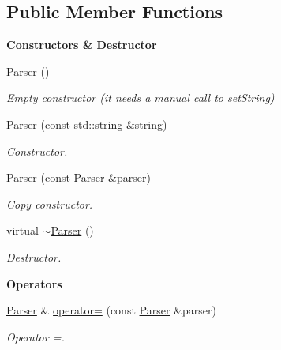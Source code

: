 \subsection*{Public Member Functions}
\begin{Indent}\textbf{ Constructors \& Destructor}\par
\begin{DoxyCompactItemize}
\item 
\mbox{\label{classLifeV_1_1Parser_a439ecd746d503e75b6e07f2933a665dc}} 
\hyperlink{classLifeV_1_1Parser_a439ecd746d503e75b6e07f2933a665dc}{Parser} ()
\begin{DoxyCompactList}\small\item\em Empty constructor (it needs a manual call to set\+String) \end{DoxyCompactList}\item 
\hyperlink{classLifeV_1_1Parser_a6acf25b7222f0c65d1414611236d1820}{Parser} (const std\+::string \&string)
\begin{DoxyCompactList}\small\item\em Constructor. \end{DoxyCompactList}\item 
\hyperlink{classLifeV_1_1Parser_a0f7c4d10928fd2139e76baf44996b610}{Parser} (const \hyperlink{classLifeV_1_1Parser}{Parser} \&parser)
\begin{DoxyCompactList}\small\item\em Copy constructor. \end{DoxyCompactList}\item 
\mbox{\label{classLifeV_1_1Parser_a34d16f77f23cf33b3bc3f8293ed0e2ed}} 
virtual \hyperlink{classLifeV_1_1Parser_a34d16f77f23cf33b3bc3f8293ed0e2ed}{$\sim$\+Parser} ()
\begin{DoxyCompactList}\small\item\em Destructor. \end{DoxyCompactList}\end{DoxyCompactItemize}
\end{Indent}
\begin{Indent}\textbf{ Operators}\par
\begin{DoxyCompactItemize}
\item 
\hyperlink{classLifeV_1_1Parser}{Parser} \& \hyperlink{classLifeV_1_1Parser_a4dde1ca3f1f88623a91d8e498e274f52}{operator=} (const \hyperlink{classLifeV_1_1Parser}{Parser} \&parser)
\begin{DoxyCompactList}\small\item\em Operator =. \end{DoxyCompactList}\end{DoxyCompactItemize}
\end{Indent}
